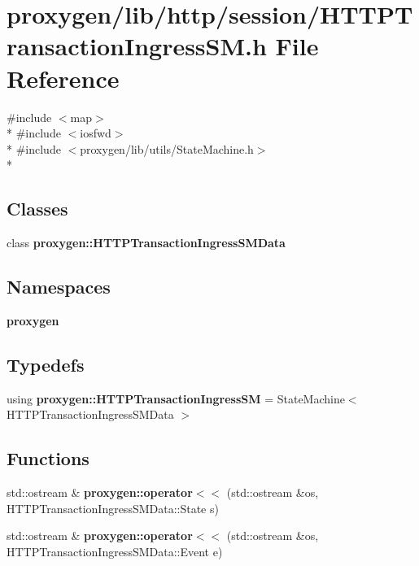 \section{proxygen/lib/http/session/\+H\+T\+T\+P\+Transaction\+Ingress\+SM.h File Reference}
\label{HTTPTransactionIngressSM_8h}
{\ttfamily \#include $<$map$>$}\\*
{\ttfamily \#include $<$iosfwd$>$}\\*
{\ttfamily \#include $<$proxygen/lib/utils/\+State\+Machine.\+h$>$}\\*
\subsection*{Classes}
\begin{DoxyCompactItemize}
\item 
class {\bf proxygen\+::\+H\+T\+T\+P\+Transaction\+Ingress\+S\+M\+Data}
\end{DoxyCompactItemize}
\subsection*{Namespaces}
\begin{DoxyCompactItemize}
\item 
 {\bf proxygen}
\end{DoxyCompactItemize}
\subsection*{Typedefs}
\begin{DoxyCompactItemize}
\item 
using {\bf proxygen\+::\+H\+T\+T\+P\+Transaction\+Ingress\+SM} = State\+Machine$<$ H\+T\+T\+P\+Transaction\+Ingress\+S\+M\+Data $>$
\end{DoxyCompactItemize}
\subsection*{Functions}
\begin{DoxyCompactItemize}
\item 
std\+::ostream \& {\bf proxygen\+::operator$<$$<$} (std\+::ostream \&os, H\+T\+T\+P\+Transaction\+Ingress\+S\+M\+Data\+::\+State s)
\item 
std\+::ostream \& {\bf proxygen\+::operator$<$$<$} (std\+::ostream \&os, H\+T\+T\+P\+Transaction\+Ingress\+S\+M\+Data\+::\+Event e)
\end{DoxyCompactItemize}

